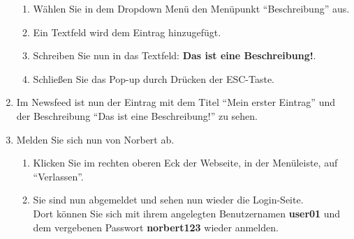 \begin{enumerate}
\begin{enumerate}
\item Wählen Sie in dem Dropdown Menü den Menüpunkt \enquote{Beschreibung} aus.
\item Ein Textfeld wird dem Eintrag hinzugefügt.
\item Schreiben Sie nun in das Textfeld: \textbf{Das ist eine Beschreibung!}. 
\item Schließen Sie das Pop-up durch Drücken der ESC-Taste.
\end{enumerate}
\item Im Newsfeed ist nun der Eintrag mit dem Titel \enquote{Mein erster Eintrag} und der Beschreibung \enquote{Das ist eine Beschreibung!} zu sehen.
\item Melden Sie sich nun von Norbert ab.
\begin{enumerate}
\item Klicken Sie im rechten oberen Eck der Webseite, in der Menüleiste, auf \enquote{Verlassen}.
\item Sie sind nun abgemeldet und sehen nun wieder die Login-Seite. \\Dort können Sie sich mit ihrem angelegten Benutzernamen \textbf{user01} und dem vergebenen Passwort \textbf{norbert123} wieder anmelden.
\end{enumerate}
\end{enumerate}

